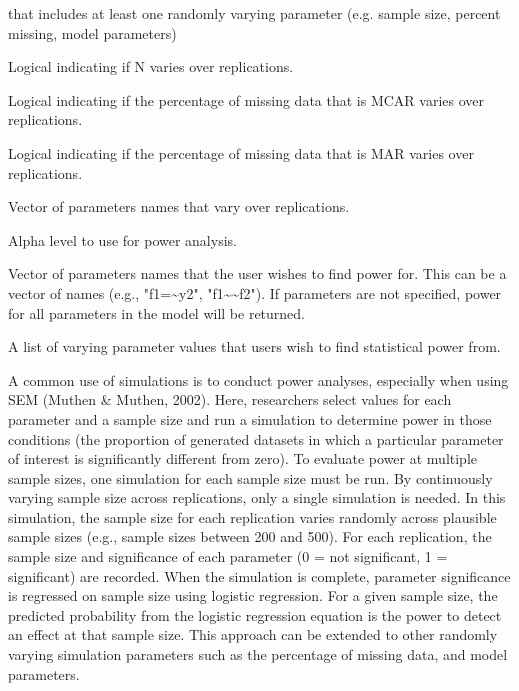 \documentclass[a4paper]{book}
\begin{document}
%
\begin{Arguments}
\begin{ldescription}
\item[\code{simResult}] 
 that includes at least one randomly varying parameter (e.g. sample size, percent missing, model parameters)

\item[\code{contN}] 
Logical indicating if N varies over replications.

\item[\code{contMCAR}] 
Logical indicating if the percentage of missing data that is MCAR varies over replications.

\item[\code{contMAR}] 
Logical indicating if the percentage of missing data that is MAR varies over replications.

\item[\code{contParam}] 
Vector of parameters names that vary over replications.

\item[\code{alpha}] 
Alpha level to use for power analysis.

\item[\code{powerParam}] 
Vector of parameters names that the user wishes to find power for. This can be a vector of names (e.g., "f1=\textasciitilde{}y2", "f1\textasciitilde{}\textasciitilde{}f2"). If parameters are not specified, power for all parameters in the model will be returned.

\item[\code{pred}] 
A list of varying parameter values that users wish to find statistical power from.

\end{ldescription}
\end{Arguments}
%
\begin{Details}\relax
A common use of simulations is to conduct power analyses, especially when using SEM (Muthen \& Muthen, 2002). Here, researchers select values for each parameter and a sample size and run a simulation to determine power in those conditions (the proportion of generated datasets in which a particular parameter of interest is significantly different from zero). To evaluate power at multiple sample sizes, one simulation for each sample size must be run. By continuously varying sample size across replications, only a single simulation is needed. In this simulation, the sample size for each replication varies randomly across plausible sample sizes (e.g., sample sizes between 200 and 500). For each replication, the sample size and significance of each parameter (0 = not significant, 1 = significant) are recorded. When the simulation is complete, parameter significance is regressed on sample size using logistic regression. For a given sample size, the predicted probability from the logistic regression equation is the power to detect an effect at that sample size. This approach can be extended to other randomly varying simulation parameters such as the percentage of missing data, and model parameters.
\end{Details}
\end{document}
